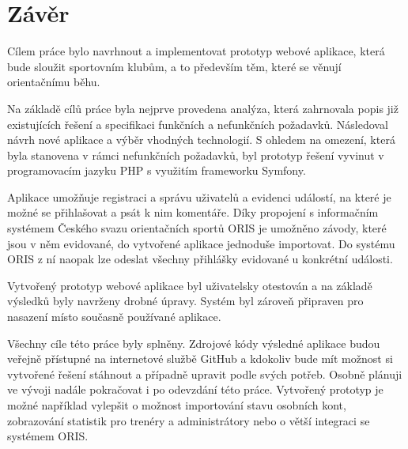 \chapter{Závěr}

Cílem práce bylo navrhnout a implementovat prototyp webové aplikace, která bude sloužit sportovním klubům, a to především těm, které se věnují orientačnímu běhu.

Na základě cílů práce byla nejprve provedena analýza, která zahrnovala popis již existujících řešení a specifikaci funkčních a nefunkčních požadavků. Následoval návrh nové aplikace a výběr vhodných technologií. S ohledem na omezení, která byla stanovena v rámci nefunkčních požadavků, byl prototyp řešení vyvinut v programovacím jazyku PHP s využitím frameworku Symfony.

Aplikace umožňuje registraci a správu uživatelů a evidenci událostí, na které je možné se přihlašovat a psát k nim komentáře. Díky propojení s informačním systémem Českého svazu orientačních sportů ORIS je umožněno závody, které jsou v něm evidované, do vytvořené aplikace jednoduše importovat. Do systému ORIS z ní naopak lze odeslat všechny přihlášky evidované u konkrétní události.

Vytvořený prototyp webové aplikace byl uživatelsky otestován a na základě výsledků byly navrženy drobné úpravy. Systém byl zároveň připraven pro nasazení místo současně používané aplikace.

Všechny cíle této práce byly splněny. Zdrojové kódy výsledné aplikace budou veřejně přístupné na internetové službě GitHub a kdokoliv bude mít možnost si vytvořené řešení stáhnout a případně upravit podle svých potřeb. Osobně plánuji ve vývoji nadále pokračovat i po odevzdání této práce. Vytvořený prototyp je možné například vylepšit o možnost importování stavu osobních kont, zobrazování statistik pro trenéry a administrátory nebo o větší integraci se systémem ORIS.
